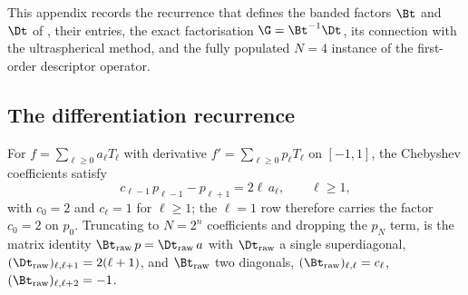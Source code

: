 %

This appendix records the recurrence that defines the banded factors $\Bt$ and $\Dt$ of , their entries, the exact factorisation $\G = \Bt^{-1}\Dt$, its connection with the ultraspherical method, and the fully populated $N = 4$ instance of the first-order descriptor operator.

\subsection{The differentiation recurrence}

For $f = \sum_{\ell\ge 0} a_\ell T_\ell$ with derivative $f' = \sum_{\ell\ge 0} p_\ell T_\ell$ on
$[-1,1]$, the Chebyshev coefficients satisfy
\begin{equation}
    c_{\ell-1}\,p_{\ell-1} - p_{\ell+1} = 2\ell\,a_\ell , \qquad \ell \ge 1 ,
    \label{eq:app-cheb-recurrence}
\end{equation}
with $c_0 = 2$ and $c_\ell = 1$ for $\ell \ge 1$; the $\ell = 1$ row therefore carries the
factor $c_0 = 2$ on $p_0$. Truncating to $N = 2^n$ coefficients and dropping the
$p_N$ term,  is the matrix identity
$\Bt_{\mathrm{raw}}\,p = \Dt_{\mathrm{raw}}\,a$ with
$\Dt_{\mathrm{raw}}$ a single superdiagonal, $(\Dt_{\mathrm{raw}})_{\ell,\ell+1} = 2(\ell+1)$,
and $\Bt_{\mathrm{raw}}$ two diagonals,
$(\Bt_{\mathrm{raw}})_{\ell,\ell} = c_\ell$, $(\Bt_{\mathrm{raw}})_{\ell,\ell+2} = -1$.

